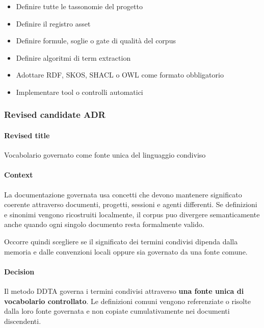 \documentclass[
  10pt,
]{article}
\providecommand{\tightlist}{%
  \setlength{\itemsep}{0pt}\setlength{\parskip}{0pt}}
\begin{document}
\begin{itemize}
\tightlist
\item
  Definire tutte le tassonomie del progetto
\item
  Definire il registro asset
\item
  Definire formule, soglie o gate di qualità del corpus
\item
  Definire algoritmi di term extraction
\item
  Adottare RDF, SKOS, SHACL o OWL come formato obbligatorio
\item
  Implementare tool o controlli automatici
\end{itemize}

\subsubsection{Revised candidate ADR}\label{revised-candidate-adr-1}

\paragraph{Revised title}\label{revised-title-1}

Vocabolario governato come fonte unica del linguaggio condiviso

\paragraph{Context}\label{context-3}

La documentazione governata usa concetti che devono mantenere
significato coerente attraverso documenti, progetti, sessioni e agenti
differenti. Se definizioni e sinonimi vengono ricostruiti localmente, il
corpus puo divergere semanticamente anche quando ogni singolo documento
resta formalmente valido.

Occorre quindi scegliere se il significato dei termini condivisi dipenda
dalla memoria e dalle convenzioni locali oppure sia governato da una
fonte comune.

\paragraph{Decision}\label{decision-3}

Il metodo DDTA governa i termini condivisi attraverso \textbf{una fonte
unica di vocabolario controllato}. Le definizioni comuni vengono
referenziate o risolte dalla loro fonte governata e non copiate
cumulativamente nei documenti discendenti.
\end{document}
